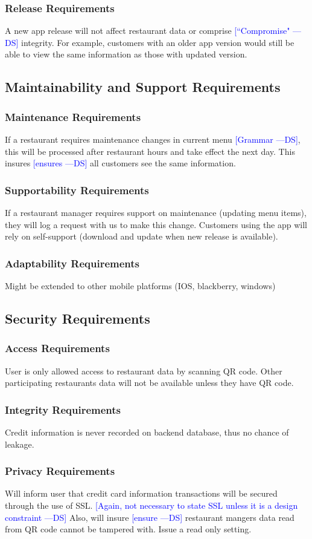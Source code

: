 \documentclass[12pt, titlepage]{article}
\newcommand{\authornote}[3]{\textcolor{#1}{[#3 ---#2]}}
\newcommand{\authornote}[3]{}
\newcommand{\ds}[1]{\authornote{blue}{DS}{#1}}
\begin{document}
\subsubsection{Release Requirements}
A new app release will not affect restaurant data or comprise 
\ds{``Compromise"}
integrity. For example, customers with an older app version would still be able to view the same information as those with updated version. 
\subsection{Maintainability and Support Requirements}
\subsubsection{Maintenance Requirements}
If a restaurant requires maintenance changes in current menu \ds{Grammar}, this will be processed after restaurant hours and take effect the next day. This insures \ds{ensures} all customers see the same information. 
\subsubsection{Supportability Requirements}
If a restaurant manager requires support on maintenance (updating menu items), they will log a request with us to make this change. Customers using the app will rely on self-support (download and update when new release is available).
\subsubsection{Adaptability Requirements}
Might be extended to other mobile platforms (IOS, blackberry, windows) 
\subsection{Security Requirements}
\subsubsection{Access Requirements}
User is only allowed access to restaurant data by scanning QR code. Other participating restaurants data will not be available unless they have QR code. 
\subsubsection{Integrity Requirements}
Credit information is never recorded on backend database, thus no chance of leakage.
\subsubsection{Privacy Requirements}
Will inform user that credit card information transactions will be secured through the use of SSL.
\ds{Again, not necessary to state SSL unless it is a design constraint}
Also, will insure \ds{ensure} restaurant mangers data read from QR code cannot be tampered with. Issue a read only setting. 
\end{document}

